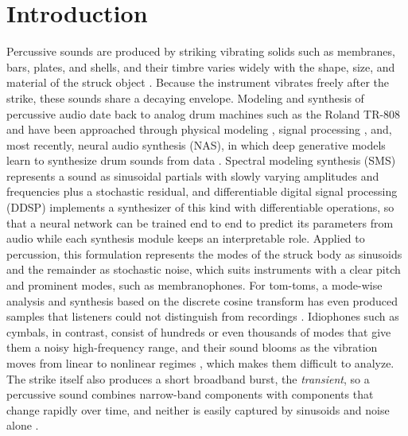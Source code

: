 \section{Introduction}
\label{sec:intro}

Percussive sounds are produced by striking vibrating solids such as membranes, bars, plates, and shells, and their timbre varies widely with the shape, size, and material of the struck object \citep{fletcher1998physics}.
Because the instrument vibrates freely after the strike, these sounds share a decaying envelope. 
Modeling and synthesis of percussive audio date back to analog drum machines such as the Roland TR-808 \citep{werner2014physically,werner2014tr808} and have been approached through physical modeling \citep{bilbao2010percussion}, signal processing \citep{karplus1983digital}, and, most recently, neural audio synthesis (NAS), in which deep generative models learn to synthesize drum sounds from data \citep{aouameur2019neural,drysdale2020adversarial,nistal2020drumgan,rouard2021crash}.
Spectral modeling synthesis (SMS) \citep{serra1990spectral} represents a sound as sinusoidal partials with slowly varying amplitudes and frequencies \citep{mcaulay1986speech} plus a stochastic residual, and differentiable digital signal processing (DDSP) \citep{engel2020ddsp} implements a synthesizer of this kind with differentiable operations, so that a neural network can be trained end to end to predict its parameters from audio while each synthesis module keeps an interpretable role.
Applied to percussion, this formulation represents the modes of the struck body as sinusoids and the remainder as stochastic noise, which suits instruments with a clear pitch and prominent modes, such as membranophones.
For tom-toms, a mode-wise analysis and synthesis based on the discrete cosine transform has even produced samples that listeners could not distinguish from recordings \citep{kirby2021evolution}.
Idiophones such as cymbals, in contrast, consist of hundreds or even thousands of modes that give them a noisy high-frequency range, and their sound blooms as the vibration moves from linear to nonlinear regimes \citep{skare2019realtime,chaigne2005nonlinear}, which makes them difficult to analyze.
The strike itself also produces a short broadband burst, the \textit{transient}, so a percussive sound combines narrow-band components with components that change rapidly over time, and neither is easily captured by sinusoids and noise alone \citep{verma2000extending,barahonarios2024noisebandnet}.

